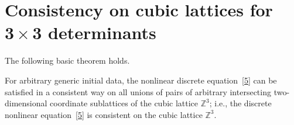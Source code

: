 \documentclass[pdftex]{sigma}
\begin{document}
\section[Consistency on cubic lattices for $3 \times 3$ determinants]{Consistency on cubic lattices for $\boldsymbol{3 \times 3}$ determinants}




The following basic theorem holds.



\begin{theorem}[\cite{1}] \label{theorem1}
For arbitrary generic initial data, the
nonlinear discrete equation~\eqref{5} can be satisfied in a
consistent way on all unions of pairs of arbitrary intersecting
two-dimensional coordinate sublattices of the cubic lattice
$\mathbb{Z}^3$; i.e., the discrete nonlinear equation~\eqref{5}
is consistent on the cubic lattice $\mathbb{Z}^3$.
\end{theorem}
\end{document}
